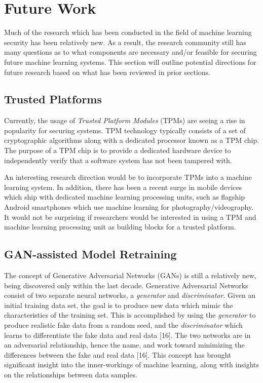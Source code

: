 \documentclass[11pt,conference]{IEEEtran}
\begin{document}
\section{Future Work}
Much of the research which has been conducted in the field of machine learning
security has been relatively new. As a result, the research community still has
many questions as to what components are necessary and/or feasible for securing
future machine learning systems.
This section will outline potential directions for future research based on
what has been reviewed in prior sections.

\subsection{Trusted Platforms}
Currently, the usage of \emph{Trusted Platform Modules} (TPMs) are seeing a
rise in popularity for securing systems. TPM technology typically consists of a
set of cryptographic algorithms along with a dedicated processor known as a TPM
chip. The purpose of a TPM chip is to provide a dedicated hardware device to
independently verify that a software system has not been tampered with. 

An interesting research direction would be to incorporate TPMs into a machine
learning system. In addition, there has been a recent surge in mobile devices
which ship with dedicated machine learning processing units, such as flagship
Android smartphones which use machine learning for photography/videography.
It would not be surprising if researchers would be interested in using a TPM
and machine learning processing unit as building blocks for a trusted platform.

\subsection{GAN-assisted Model Retraining}
The concept of Generative Adversarial Networks (GANs) is still a relatively
new, being discovered only within the last decade. Generative Adversarial
Networks consist of two separate neural networks, a \emph{generator}
and \emph{discriminator}. Given an initial training data set, the goal is to
produce new data which mimic the characteristics of the training set. This is
accomplished by using the \emph{generator} to produce realistic fake data from
a random seed, and the \emph{discriminator} which learns to differentiate the
fake data and real data [16]. The two networks are in an adversarial relationship,
hence the name, and work toward minimizing the differences between the fake and
real data [16]. This concept has brought significant insight into the inner-workings
of machine learning, along with insights on the relationships between data
samples.
\end{document}
